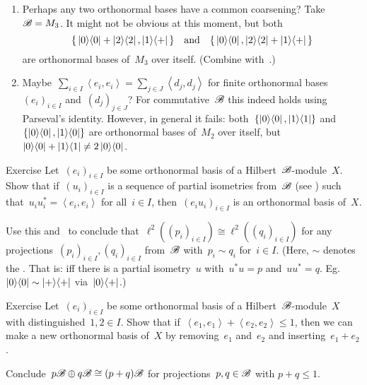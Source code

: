 \documentclass[b]{subfiles}
\begin{document}
\begin{parsec}
\begin{point}
\begin{enumerate}
\item
Perhaps any two orthonormal bases have a common coarsening?
Take~$\mathscr{B} = M_3$.
It might not be obvious at this moment, but both
\begin{equation*}
    \{\,\left|0\right>\!\left<0\right| + \left|2\right>\!\left<2\right|, \left|1\right>\!\left<+\right|\,\}
    \quad \text{and} \quad
    \{\,\left|0\right>\!\left<0\right|, \left|2\right>\!\left<2\right|+ \left|1\right>\!\left<+\right|\,\}
\end{equation*}
are orthonormal bases of~$M_3$ over itself.
(Combine  with~.)

\item
Maybe~$\sum_{i\in I} \left<e_i,e_i\right> = \sum_{j\in J} \left<d_j,d_j\right>$
    for finite orthonormal bases~$(e_i)_{i \in I}$ and~$(d_j)_{j \in J}$?
For commutative~$\mathscr{B}$ this indeed holds using Parseval's identity.
However, in general it fails:
        both~$\{\left|0\right>\!\left<0\right|, \left|1\right>\!\left<1\right|\}$ and
        $\{\left|0\right>\!\left<0\right|, \left|1\right>\!\left<0\right| \}$
        are orthonormal bases of~$M_2$ over itself,
    but~$\left|0\right>\!\left<0\right|+ \left|1\right>\!\left<1\right| \neq 2 \left|0\right>\!\left<0\right|$.
\end{enumerate}
\end{point}
\begin{point}[onb1]{Exercise}%
Let~$(e_i)_{ i \in I}$ be some orthonormal basis of a Hilbert~$\mathscr{B}$-module~$X$.
Show that if~$(u_i)_{i \in I}$
    is a sequence of partial isometries
    from~$\mathscr{B}$
    (see )
    such that~$u_iu_i^* = \left<e_i,e_i\right>$
    for all~$i \in I$,
    then~$(e_iu_i)_{i \in I}$
    is an orthonormal basis of~$X$.

Use this and~ to conclude
    that~$\ell^2((p_i)_{i \in I}) \cong \ell^2((q_i)_{i \in I})$
    for any projections~$(p_i)_{i\in I}, (q_i)_{i\in I} $
    from~$\mathscr{B}$
    with~$p_i \sim q_i$ for~$i \in I$.
    (Here, $\sim$ denotes the .
    That is:  iff there is a partial isometry~$u$
    with~$u^*u = p$ and~$uu^*=q$.
    Eg.~$\left|0\right>\!\left<0\right| \sim \left|+\right>\!\left<+\right|$
        via~$\left|0\right>\!\left<+\right|$.)
\end{point}

\begin{point}[onb2]{Exercise}%
Let~$(e_i)_{ i \in I}$ be some orthonormal basis of a Hilbert~$\mathscr{B}$-module~$X$
    with distinguished~$1,2 \in I$.
Show that if~$\left<e_1,e_1\right> + \left<e_2,e_2\right> \leq 1$,
    then we can make a new orthonormal basis of~$X$ by  removing~$e_1$ and~$e_2$
        and inserting~$e_1 + e_2$.

Conclude~$p \mathscr{B} \oplus q \mathscr{B} \cong (p+q) \mathscr{B}$
    for projections~$p,q \in \mathscr{B}$ with $p+q \leq 1$.
\end{point}
\end{parsec}
\end{document}
